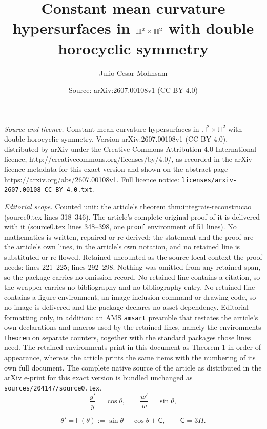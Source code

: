 \documentclass[10pt,a4paper]{amsart}
\title{Constant mean curvature hypersurfaces in $\Hyp^2\times\Hyp^2$ with double horocyclic symmetry}
\author{Julio Cesar Mohnsam}
\date{Source: arXiv:2607.00108v1 (CC BY 4.0)}
\newcommand{\Hyp}{\mathbb{H}}
\newcommand{\C}{\mathsf{C}}
\newcommand{\F}{\mathsf{F}}
\begin{document}
\maketitle

\noindent\emph{Source and licence.} Constant mean curvature hypersurfaces in $\Hyp^2\times\Hyp^2$ with double horocyclic symmetry. Version arXiv:2607.00108v1 (CC BY 4.0), distributed by arXiv under the Creative Commons Attribution 4.0 International licence, http://creativecommons.org/licenses/by/4.0/, as recorded in the arXiv licence metadata for this exact version and shown on the abstract page https://arxiv.org/abs/2607.00108v1. Full licence notice: \texttt{licenses/arxiv-2607.00108-CC-BY-4.0.txt}.\par\smallskip

\noindent\textit{Editorial scope.} Counted unit: the article's theorem thm:integrais-reconstrucao (source0.tex lines 318--346). The article's complete original proof of it is delivered with it (source0.tex lines 348--398, one \texttt{proof} environment of 51 lines). No mathematics is written, repaired or re-derived: the statement and the proof are the article's own lines, in the article's own notation, and no retained line is substituted or re-flowed.  Retained uncounted as the source-local context the proof needs: lines 221--225; lines 292--298.  Nothing was omitted from any retained span, so the package carries no omission record.  No retained line contains a citation, so the wrapper carries no bibliography and no bibliography entry.  No retained line contains a figure environment, an image-inclusion command or drawing code, so no image is delivered and the package declares no asset dependency.  Editorial formatting only, in addition: an AMS \texttt{amsart} preamble that restates the article's own declarations and macros used by the retained lines, namely the environments \texttt{theorem} on separate counters, together with the standard packages those lines need.  The retained environments print in this document as Theorem 1 in order of appearance, whereas the article prints the same items with the numbering of its own full document.  The complete native source of the article as distributed in the arXiv e-print for this exact version is bundled unchanged as \texttt{sources/204147/source0.tex}.
\begin{equation}\label{eq:theta-def}
\frac{y'}{y}=\cos\theta,
\qquad
\frac{w'}{w}=\sin\theta,
\end{equation}

\begin{equation}\label{eq:edo-cmc}
\boxed{\;
\theta'=\F(\theta):=\sin\theta-\cos\theta+\C,
\qquad
\C=3H.
\;}
\end{equation}
\end{document}
